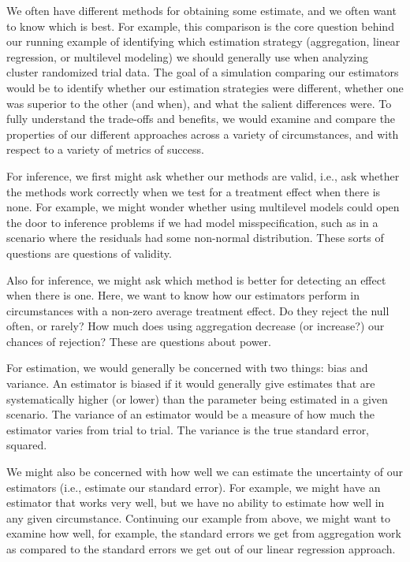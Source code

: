 \documentclass[
]{book}
\begin{document}
We often have different methods for obtaining some estimate, and we often want to know which is best.
For example, this comparison is the core question behind our running example of identifying which estimation strategy (aggregation, linear regression, or multilevel modeling) we should generally use when analyzing cluster randomized trial data.
The goal of a simulation comparing our estimators would be to identify whether our estimation strategies were different, whether one was superior to the other (and when), and what the salient differences were.
To fully understand the trade-offs and benefits, we would examine and compare the properties of our different approaches across a variety of circumstances, and with respect to a variety of metrics of success.

For inference, we first might ask whether our methods are valid, i.e., ask whether the methods work correctly when we test for a treatment effect when there is none.
For example, we might wonder whether using multilevel models could open the door to inference problems if we had model misspecification, such as in a scenario where the residuals had some non-normal distribution.
These sorts of questions are questions of validity.

Also for inference, we might ask which method is better for detecting an effect when there is one.
Here, we want to know how our estimators perform in circumstances with a non-zero average treatment effect.
Do they reject the null often, or rarely?
How much does using aggregation decrease (or increase?) our chances of rejection?
These are questions about power.

For estimation, we would generally be concerned with two things: bias and variance.
An estimator is biased if it would generally give estimates that are systematically higher (or lower) than the parameter being estimated in a given scenario.
The variance of an estimator would be a measure of how much the estimator varies from trial to trial.
The variance is the true standard error, squared.

We might also be concerned with how well we can estimate the uncertainty of our estimators (i.e., estimate our standard error).
For example, we might have an estimator that works very well, but we have no ability to estimate how well in any given circumstance.
Continuing our example from above, we might want to examine how well, for example, the standard errors we get from aggregation work as compared to the standard errors we get out of our linear regression approach.
\end{document}
